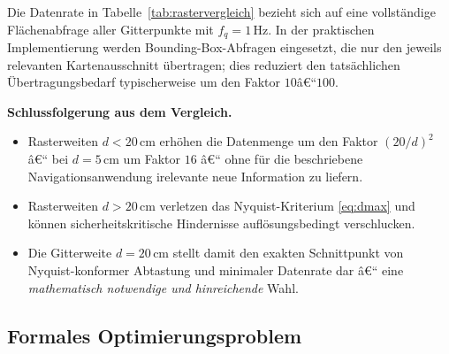﻿\documentclass[a4paper,12pt]{article}
\theoremstyle{definition}
\begin{document}
\noindent
Die Datenrate in Tabelle~\ref{tab:rastervergleich} bezieht sich auf eine
vollständige Flächenabfrage aller Gitterpunkte mit $f_q = 1\,\text{Hz}$.
In der praktischen Implementierung werden Bounding-Box-Abfragen eingesetzt,
die nur den jeweils relevanten Kartenausschnitt übertragen; dies reduziert
den tatsächlichen Übertragungsbedarf typischerweise um den Faktor
$10$â€“$100$.

\medskip\noindent
\textbf{Schlussfolgerung aus dem Vergleich.}
\begin{itemize}
  \item Rasterweiten $d < 20\,\text{cm}$ erhöhen die Datenmenge um den Faktor
        $(20/d)^2$ â€“ bei $d = 5\,\text{cm}$ um Faktor $16$
        â€“ ohne für die beschriebene Navigationsanwendung
        irelevante neue Information zu liefern.
  \item Rasterweiten $d > 20\,\text{cm}$ verletzen das Nyquist-Kriterium
        \eqref{eq:dmax} und können sicherheitskritische Hindernisse
        auflösungsbedingt verschlucken.
  \item Die Gitterweite $d = 20\,\text{cm}$ stellt damit den exakten
        Schnittpunkt von Nyquist-konformer Abtastung und minimaler
        Datenrate dar â€“ eine \emph{mathematisch notwendige und
        hinreichende} Wahl.
\end{itemize}

\subsection{Formales Optimierungsproblem}
\end{document}
